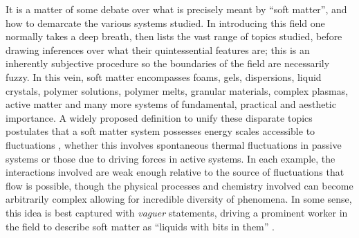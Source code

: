 \documentclass[11pt,twoside]{report}
\begin{document}
It is a matter of some debate over what is precisely meant by ``soft matter'', and how to demarcate the various systems studied.
In introducing this field one normally takes a deep breath, then lists the vast range of topics studied, before drawing inferences over what their quintessential features are; this is an inherently subjective procedure so the boundaries of the field are necessarily fuzzy.
In this vein, soft matter encompasses foams, gels, dispersions, liquid crystals, polymer solutions, polymer melts, granular materials, complex plasmas, active matter and many more systems of fundamental, practical and aesthetic importance.
A widely proposed definition to unify these disparate topics postulates that a soft matter system possesses energy scales accessible to fluctuations  \cite{LubenskySSC1997}, whether this involves spontaneous thermal fluctuations in passive systems or those due to driving forces in active systems.
In each example, the interactions involved are weak enough relative to the source of fluctuations that flow is possible, though the physical processes and chemistry involved can become arbitrarily complex allowing for incredible diversity of phenomena.
In some sense, this idea is best captured with \emph{vaguer} statements, driving a prominent worker in the field to describe soft matter as ``liquids with bits in them'' \cite{Poon2018}.
\end{document}
